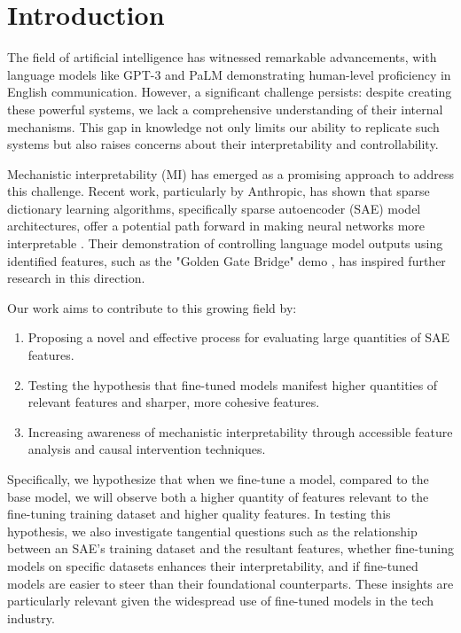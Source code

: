 \section{Introduction}

The field of artificial intelligence has witnessed remarkable advancements, with language models like GPT-3 and PaLM demonstrating human-level proficiency in English communication. However, a significant challenge persists: despite creating these powerful systems, we lack a comprehensive understanding of their internal mechanisms. This gap in knowledge not only limits our ability to replicate such systems but also raises concerns about their interpretability and controllability.

Mechanistic interpretability (MI) has emerged as a promising approach to address this challenge. Recent work, particularly by Anthropic, has shown that sparse dictionary learning algorithms, specifically sparse autoencoder (SAE) model architectures, offer a potential path forward in making neural networks more interpretable \cite{bricken2023monosemanticity}. Their demonstration of controlling language model outputs using identified features, such as the "Golden Gate Bridge" demo \cite{templeton2024scaling}, has inspired further research in this direction.

Our work aims to contribute to this growing field by:

\begin{enumerate}
    \item Proposing a novel and effective process for evaluating large quantities of SAE features.
    \item Testing the hypothesis that fine-tuned models manifest higher quantities of relevant features and sharper, more cohesive features.
    \item Increasing awareness of mechanistic interpretability through accessible feature analysis and causal intervention techniques.
\end{enumerate}

Specifically, we hypothesize that when we fine-tune a model, compared to the base model, we will observe both a higher quantity of features relevant to the fine-tuning training dataset and higher quality features. In testing this hypothesis, we also investigate tangential questions such as the relationship between an SAE's training dataset and the resultant features, whether fine-tuning models on specific datasets enhances their interpretability, and if fine-tuned models are easier to steer than their foundational counterparts. These insights are particularly relevant given the widespread use of fine-tuned models in the tech industry.

